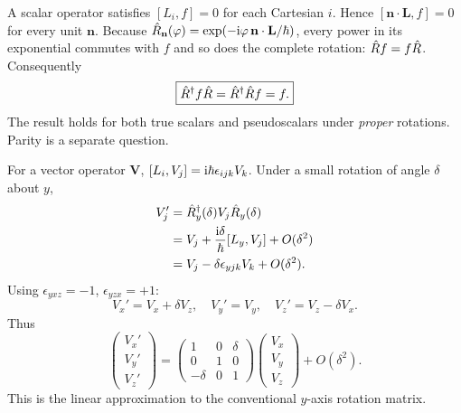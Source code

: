 A scalar operator satisfies
$[L_i,f]=0$ for each Cartesian $i$.
Hence $[\mathbf n\cdot\mathbf L,f]=0$
for every unit $\mathbf n$.
Because
$\hat R_{\mathbf n}(\varphi)
=\exp(-\mathrm i\varphi\,\mathbf n\cdot\mathbf L/\hbar)$,
every power in its exponential commutes
with $f$ and so does the complete rotation:
$\hat R f=f\hat R$.
Consequently
\begin{equation}
\boxed{\hat R^\dagger f\hat R
=\hat R^\dagger\hat R f=f.}
\end{equation}
The result holds for both true scalars
and pseudoscalars under \emph{proper}
rotations. Parity is a separate question.

For a vector operator $\mathbf V$,
$[L_i,V_j]=\mathrm i\hbar\epsilon_{ijk}V_k$.
Under a small rotation of angle
$\delta$ about $y$,
\begin{align}
V_j'&=\hat R_y^\dagger(\delta)V_j\hat R_y(\delta)\\
&=V_j+\frac{\mathrm i\delta}{\hbar}[L_y,V_j]
+O(\delta^2)\\
&=V_j-\delta\epsilon_{yjk}V_k+O(\delta^2).
\end{align}
Using $\epsilon_{yxz}=-1$,
$\epsilon_{yzx}=+1$:
\[
V_x'=V_x+\delta V_z,\quad
V_y'=V_y,\quad
V_z'=V_z-\delta V_x.
\]
Thus
\begin{equation}
\boxed{\begin{pmatrix}V_x'\\V_y'\\V_z'\end{pmatrix}
=\begin{pmatrix}
1&0&\delta\\
0&1&0\\
-\delta&0&1
\end{pmatrix}
\begin{pmatrix}V_x\\V_y\\V_z\end{pmatrix}
+O(\delta^2).}
\end{equation}
This is the linear approximation to
the conventional $y$-axis rotation
matrix.

